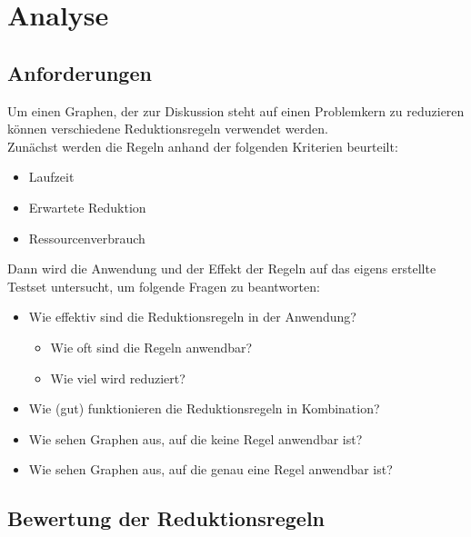 
\chapter{Analyse}
\label{ch:Analyse}




\section{Anforderungen}
\label{ch:Analyse:sec:Anforderungen}

Um einen Graphen, der zur Diskussion steht auf einen Problemkern zu reduzieren können verschiedene Reduktionsregeln verwendet werden. \\
Zunächst werden die Regeln anhand der folgenden Kriterien beurteilt:
\begin{itemize}
	\item Laufzeit
	\item Erwartete Reduktion
	\item Ressourcenverbrauch
\end{itemize}
Dann wird die Anwendung und der Effekt der Regeln auf das eigens erstellte Testset untersucht, um folgende Fragen zu beantworten:
\begin{itemize}
\item Wie effektiv sind die Reduktionsregeln in der Anwendung?
	\begin{itemize}
		\item Wie oft sind die Regeln anwendbar?
		\item Wie viel wird reduziert?
	\end{itemize}
\item Wie (gut) funktionieren die Reduktionsregeln in Kombination?
\item Wie sehen Graphen aus, auf die keine Regel anwendbar ist?
\item Wie sehen Graphen aus, auf die genau eine Regel anwendbar ist?
\end{itemize}

\section{Bewertung der Reduktionsregeln}
\label{ch:Analyse:sec:Berwertung}

